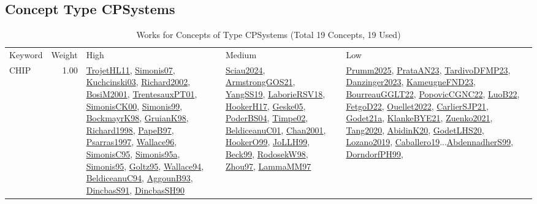 \subsection{Concept Type CPSystems}
\label{sec:CPSystems}
\label{CPSystems}
{\scriptsize
\begin{longtable}{p{3cm}r>{\raggedright\arraybackslash}p{6cm}>{\raggedright\arraybackslash}p{6cm}>{\raggedright\arraybackslash}p{8cm}}
\rowcolor{white}\caption{Works for Concepts of Type CPSystems (Total 19 Concepts, 19 Used)}\\ \toprule
\rowcolor{white}Keyword & Weight & High & Medium & Low\\ \midrule\endhead
\bottomrule
\endfoot
\index{CHIP}\index{CPSystems!CHIP}CHIP &  1.00 & \hyperref[detail:TrojetHL11]{TrojetHL11}, \hyperref[detail:Simonis07]{Simonis07}, \hyperref[detail:Kuchcinski03]{Kuchcinski03}, \hyperref[detail:Richard2002]{Richard2002}, \hyperref[detail:BosiM2001]{BosiM2001}, \hyperref[detail:TrentesauxPT01]{TrentesauxPT01}, \hyperref[detail:SimonisCK00]{SimonisCK00}, \hyperref[detail:Simonis99]{Simonis99}, \hyperref[detail:BockmayrK98]{BockmayrK98}, \hyperref[detail:GruianK98]{GruianK98}, \hyperref[detail:Richard1998]{Richard1998}, \hyperref[detail:PapeB97]{PapeB97}, \hyperref[detail:Psarras1997]{Psarras1997}, \hyperref[detail:Wallace96]{Wallace96}, \hyperref[detail:SimonisC95]{SimonisC95}, \hyperref[detail:Simonis95a]{Simonis95a}, \hyperref[detail:Simonis95]{Simonis95}, \hyperref[detail:Goltz95]{Goltz95}, \hyperref[detail:Wallace94]{Wallace94}, \hyperref[detail:BeldiceanuC94]{BeldiceanuC94}, \hyperref[detail:AggounB93]{AggounB93}, \hyperref[detail:DincbasS91]{DincbasS91}, \hyperref[detail:DincbasSH90]{DincbasSH90} & \hyperref[detail:Sciau2024]{Sciau2024}, \hyperref[detail:ArmstrongGOS21]{ArmstrongGOS21}, \hyperref[detail:YangSS19]{YangSS19}, \hyperref[detail:LaborieRSV18]{LaborieRSV18}, \hyperref[detail:HookerH17]{HookerH17}, \hyperref[detail:Geske05]{Geske05}, \hyperref[detail:PoderBS04]{PoderBS04}, \hyperref[detail:Timpe02]{Timpe02}, \hyperref[detail:BeldiceanuC01]{BeldiceanuC01}, \hyperref[detail:Chan2001]{Chan2001}, \hyperref[detail:HookerO99]{HookerO99}, \hyperref[detail:JoLLH99]{JoLLH99}, \hyperref[detail:Beck99]{Beck99}, \hyperref[detail:RodosekW98]{RodosekW98}, \hyperref[detail:Zhou97]{Zhou97}, \hyperref[detail:LammaMM97]{LammaMM97} & \hyperref[detail:Prumm2025]{Prumm2025}, \hyperref[detail:PrataAN23]{PrataAN23}, \hyperref[detail:TardivoDFMP23]{TardivoDFMP23}, \hyperref[detail:Danzinger2023]{Danzinger2023}, \hyperref[detail:KameugneFND23]{KameugneFND23}, \hyperref[detail:BourreauGGLT22]{BourreauGGLT22}, \hyperref[detail:PopovicCGNC22]{PopovicCGNC22}, \hyperref[detail:LuoB22]{LuoB22}, \hyperref[detail:FetgoD22]{FetgoD22}, \hyperref[detail:Ouellet2022]{Ouellet2022}, \hyperref[detail:CarlierSJP21]{CarlierSJP21}, \hyperref[detail:Godet21a]{Godet21a}, \hyperref[detail:KlankeBYE21]{KlankeBYE21}, \hyperref[detail:Zuenko2021]{Zuenko2021}, \hyperref[detail:Tang2020]{Tang2020}, \hyperref[detail:AbidinK20]{AbidinK20}, \hyperref[detail:GodetLHS20]{GodetLHS20}, \hyperref[detail:Lozano2019]{Lozano2019}, \hyperref[detail:Caballero19]{Caballero19}...\hyperref[detail:AbdennadherS99]{AbdennadherS99}, \hyperref[detail:DorndorfPH99]{DorndorfPH99}, 
\end{longtable}}
